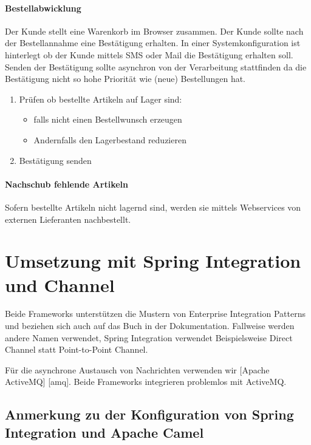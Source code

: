 \documentclass[12pt,a4paper,ngerman]{article}
\begin{document}
\paragraph{Bestellabwicklung}

Der Kunde stellt eine Warenkorb im Browser zusammen. Der Kunde sollte
nach der Bestellannahme eine Bestätigung erhalten. In einer
Systemkonfiguration ist hinterlegt ob der Kunde mittels SMS oder Mail
die Bestätigung erhalten soll. Senden der Bestätigung sollte asynchron
von der Verarbeitung stattfinden da die Bestätigung nicht so hohe
Priorität wie (neue) Bestellungen hat.

\begin{enumerate}[1.]
\item
  Prüfen ob bestellte Artikeln auf Lager sind:

  \begin{itemize}
  \item
    falls nicht einen Bestellwunsch erzeugen
  \item
    Andernfalls den Lagerbestand reduzieren
  \end{itemize}
\item
  Bestätigung senden
\end{enumerate}

\paragraph{Nachschub fehlende Artikeln}

Sofern bestellte Artikeln nicht lagernd sind, werden sie mittels
Webservices von externen Lieferanten nachbestellt.

\section{Umsetzung mit Spring Integration und Channel}

Beide Frameworks unterstützen die Mustern von Enterprise Integration
Patterns und beziehen sich auch auf das Buch in der Dokumentation.
Fallweise werden andere Namen verwendet, Spring Integration verwendet
Beispielsweise Direct Channel statt Point-to-Point Channel.

Für die asynchrone Austausch von Nachrichten verwenden wir {[}Apache
ActiveMQ{]} {[}amq{]}. Beide Frameworks integrieren problemlos mit
ActiveMQ.

\subsection{Anmerkung zu der Konfiguration von Spring Integration und
Apache Camel}
\end{document}

